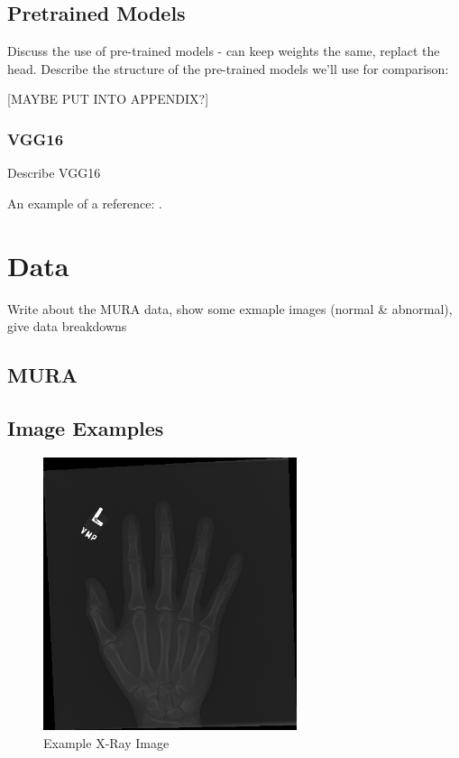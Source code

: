 \documentclass[11pt]{article} %
\theoremstyle{plain}
\theoremstyle{definition}
\begin{document}
\subsection{Pretrained Models}
Discuss the use of pre-trained models - can keep weights the same, replact the head.
Describe the structure of the pre-trained models we'll use for comparison:

[MAYBE PUT INTO APPENDIX?] 
\subsubsection{VGG16}
Describe VGG16

An example of a reference:
\cite{hastie/etal:2009}.



\newpage
\section{Data}
Write about the MURA data, show some exmaple images (normal & abnormal), give data breakdowns 

\subsection{MURA}

\subsection{Image Examples}

\begin{figure}[!ht]
  \caption{Example X-Ray Image}
  \label{fig:xray1}
  \includegraphics[width=\textwidth, height=8cm]{image1}
  \centering
\end{figure}
\end{document}
